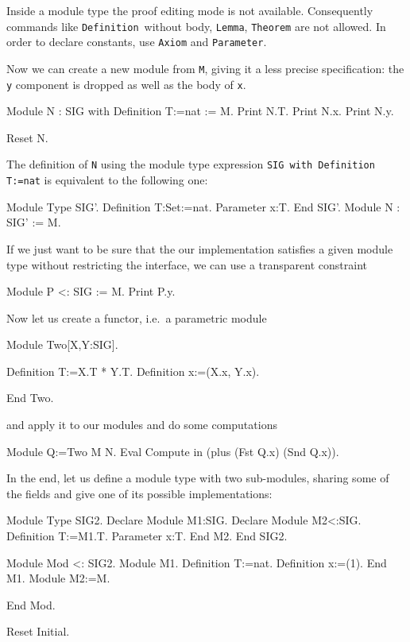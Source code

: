 \noindent
Inside a module type the proof editing mode is not available.
Consequently commands like \texttt{Definition}\ without body,
\texttt{Lemma}, \texttt{Theorem} are not allowed.  In order to declare
constants, use \texttt{Axiom} and \texttt{Parameter}.

Now we can create a new module from \texttt{M}, giving it a less
precise specification: the \texttt{y} component is dropped as well
as the body of \texttt{x}.

\begin{coq_example}
Module N  :  SIG with Definition T:=nat  :=  M.
Print N.T.
Print N.x.
Print N.y.
\end{coq_example}
\begin{coq_eval}
Reset N.
\end{coq_eval}

\noindent
The definition of \texttt{N} using the module type expression
\texttt{SIG with Definition T:=nat} is equivalent to the following
one:

\begin{coq_example*}
Module Type SIG'.
  Definition T:Set:=nat.
  Parameter x:T.
End SIG'.
Module N : SIG' := M.
\end{coq_example*}
If we just want to be sure that the our implementation satisfies a
given module type without restricting the interface, we can use a
transparent constraint
\begin{coq_example}
Module P <: SIG := M.
Print P.y.
\end{coq_example}
Now let us create a functor, i.e.\ a parametric module
\begin{coq_example}
Module Two[X,Y:SIG].
\end{coq_example}
\begin{coq_example*}
  Definition T:=X.T * Y.T.
  Definition x:=(X.x, Y.x).
\end{coq_example*}
\begin{coq_example}
End Two.
\end{coq_example}
and apply it to our modules and do some computations
\begin{coq_example}
Module Q:=Two M N.
Eval Compute in (plus (Fst Q.x) (Snd Q.x)).
\end{coq_example}
In the end, let us define a module type with two sub-modules, sharing
some of the fields and give one of its possible implementations:
\begin{coq_example}
Module Type SIG2.
  Declare Module M1:SIG.
  Declare Module M2<:SIG.
    Definition T:=M1.T.
    Parameter x:T.
  End M2.
End SIG2.
\end{coq_example}
\begin{coq_example*}
Module Mod <: SIG2.
  Module M1.
    Definition T:=nat.
    Definition x:=(1).
  End M1.
  Module M2:=M.
\end{coq_example*}
\begin{coq_example}
End Mod.
\end{coq_example}
\begin{coq_eval}
Reset Initial.
\end{coq_eval}

